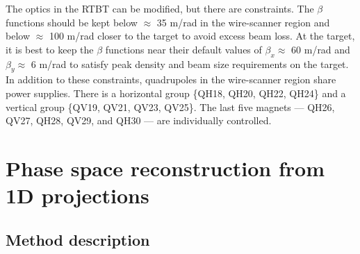 The optics in the RTBT can be modified, but there are constraints. The $\beta$ functions should be kept below $\approx$ 35 m/rad in the wire-scanner region and below $\approx$ 100 m/rad closer to the target to avoid excess beam loss. At the target, it is best to keep the $\beta$ functions near their default values of $\beta_x \approx$ 60 m/rad and $\beta_y \approx$ 6 m/rad to satisfy peak density and beam size requirements on the target. In addition to these constraints, quadrupoles in the wire-scanner region share power supplies. There is a horizontal group \{QH18, QH20, QH22, QH24\} and a vertical group \{QV19, QV21, QV23, QV25\}. The last five magnets — QH26, QV27, QH28, QV29, and QH30 — are individually controlled.


\section{Phase space reconstruction from 1D projections}\label{sec:Phase space reconstruction from 1D projections}

\subsection{Method description}


